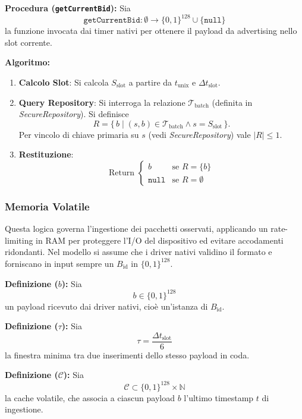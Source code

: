 \documentclass[a4paper,11pt,table,dvipsnames]{article}
\begin{document}
\textbf{Procedura (\texttt{getCurrentBid}):}
Sia
\[
    \texttt{getCurrentBid}: \emptyset \rightarrow \{0,1\}^{128} \cup \{\texttt{null}\}
\]
la funzione invocata dai timer nativi per ottenere il payload da advertising nello slot corrente.

\textbf{Algoritmo:}
\begin{enumerate}
    \item \textbf{Calcolo Slot}:
          Si calcola \(S_{\text{slot}}\) a partire da \(t_{\text{unix}}\) e \(\Delta t_{\text{slot}}\).

    \item \textbf{Query Repository}:
          Si interroga la relazione \(\mathcal{T}_{\text{batch}}\) (definita in \emph{SecureRepository}).
          Si definisce
          \[
              R = \{\, b \mid (s,b)\in \mathcal{T}_{\text{batch}} \land s = S_{\text{slot}} \,\}.
          \]
          Per vincolo di chiave primaria su \(s\) (vedi \emph{SecureRepository}) vale \(|R| \le 1\).

    \item \textbf{Restituzione}:
          \[
              \text{Return } \begin{cases}
                  b             & \text{se } R = \{b\}     \\
                  \texttt{null} & \text{se } R = \emptyset
              \end{cases}
          \]
\end{enumerate}

\subsubsection{Memoria Volatile}
Questa logica governa l’ingestione dei pacchetti osservati, applicando un rate-limiting in RAM per proteggere l’I/O del dispositivo ed evitare accodamenti ridondanti.
Nel modello si assume che i driver nativi validino il formato e forniscano in input sempre un \(B_{\text{id}}\) in \(\{0,1\}^{128}\).

\textbf{Definizione (\(b\)):}
Sia
\[
    b \in \{0,1\}^{128}
\]
un payload ricevuto dai driver nativi, cioè un’istanza di \(B_{\text{id}}\).

\textbf{Definizione (\(\tau\)):}
Sia
\[
    \tau = \frac{\Delta t_{\text{slot}}}{6}
\]
la finestra minima tra due inserimenti dello stesso payload in coda.


\textbf{Definizione (\(\mathcal{C}\)):}
Sia
\[
    \mathcal{C} \subset \{0,1\}^{128} \times \mathbb{N}
\]
la cache volatile, che associa a ciascun payload \(b\) l’ultimo timestamp \(t\) di ingestione.
\end{document}
